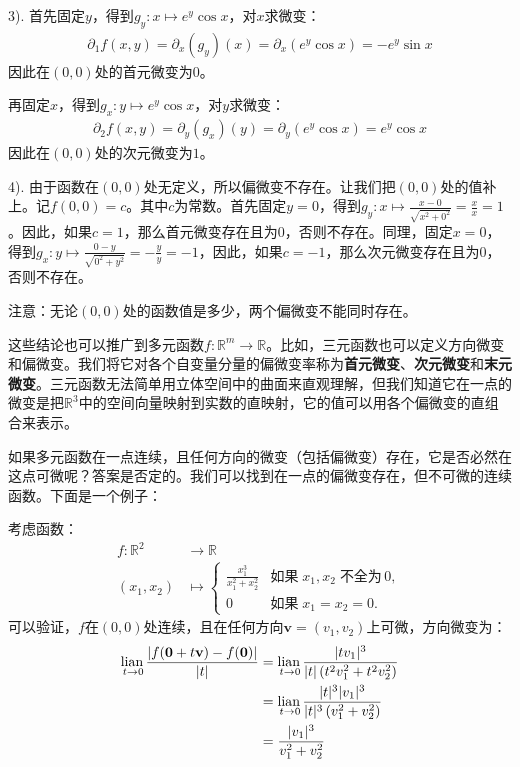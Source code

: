 \documentclass[12pt,UTF8]{ctexbook}
\begin{document}
\begin{so}
    3). 首先固定$y$，得到$g_y: x\mapsto e^y\cos{x} $，对$x$求微变：
    \begin{align*}
        \partial_{1} f (x, y) = \partial_x (g_y) (x) = \partial_x \left( e^y\cos{x} \right) = -e^y\sin{x}
    \end{align*}
    因此在$(0,0)$处的首元微变为$0$。

    再固定$x$，得到$g_x: y\mapsto e^y\cos{x} $，对$y$求微变：
    \begin{align*}
        \partial_{2} f (x, y) = \partial_y (g_x) (y)  = \partial_y \left( e^y\cos{x} \right) = e^y\cos{x}
    \end{align*}
    因此在$(0,0)$处的次元微变为$1$。
    
    4). 由于函数在$(0,0)$处无定义，所以偏微变不存在。让我们把$(0,0)$处的值补上。记$f(0,0)=c$。其中$c$为常数。首先固定$y=0$，得到$g_y: x\mapsto \displaystyle\frac{x - 0}{\sqrt{x^2 + 0^2}} = \frac{x}{x} = 1 $。因此，如果$c=1$，那么首元微变存在且为$0$，否则不存在。同理，固定$x=0$，得到$g_x: y\mapsto \displaystyle\frac{0 - y}{\sqrt{0^2 + y^2}} = -\frac{y}{y} = -1$，因此，如果$c=-1$，那么次元微变存在且为$0$，否则不存在。

    注意：无论$(0,0)$处的函数值是多少，两个偏微变不能同时存在。
\end{so}

这些结论也可以推广到多元函数$f: \mathbb{R}^m\rightarrow \mathbb{R}$。比如，三元函数也可以定义方向微变和偏微变。我们将它对各个自变量分量的偏微变率称为\textbf{首元微变}、\textbf{次元微变}和\textbf{末元微变}。三元函数无法简单用立体空间中的曲面来直观理解，但我们知道它在一点的微变是把$\mathbb{R}^3$中的空间向量映射到实数的直映射，它的值可以用各个偏微变的直组合来表示。

如果多元函数在一点连续，且任何方向的微变（包括偏微变）存在，它是否必然在这点可微呢？答案是否定的。我们可以找到在一点的偏微变存在，但不可微的连续函数。下面是一个例子：

考虑函数：
\begin{align*}
    f: \mathbb{R}^2 &\rightarrow \mathbb{R} \\
    (x_1, x_2) &\mapsto \begin{cases}
        \displaystyle\frac{x_1^3}{x_1^2 + x_2^2} & \mbox{如果}\; x_1, x_2\; \mbox{不全为}\, 0,\\
        0 & \mbox{如果}\; x_1 = x_2 = 0.
    \end{cases}
\end{align*}
可以验证，$f$在$(0,0)$处连续，且在任何方向$\mathbf{v} = (v_1, v_2)$上可微，方向微变为：
\begin{align*}
    \underset{t\to 0}{\operatorname{lian}\,} \frac{\left|f(\mathbf{0} + t\mathbf{v}) - f(\mathbf{0})\right|}{|t|} &= \underset{t\to 0}{\operatorname{lian}\,} \frac{|tv_1|^3}{|t|\left(t^2v_1^2 + t^2v_2^2\right)} \\
    &= \underset{t\to 0}{\operatorname{lian}\,} \frac{|t|^3|v_1|^3}{|t|^3\left(v_1^2 + v_2^2\right)} \\
    &= \frac{|v_1|^3}{v_1^2 + v_2^2}
\end{align*}
\end{document}
